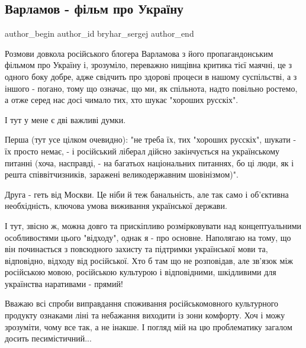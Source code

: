  
 
 
 
 
 
\subsection{Варламов - фільм про Україну}
\label{sec:06_11_2021.fb.bryhar_sergej.1.varlamov_film_pro_ukrainu}
 
\ifcmt
 author_begin
   author_id bryhar_sergej
 author_end
\fi

Розмови довкола російського блогера Варламова з його пропагандонським фільмом
про Україну і, зрозуміло, переважно нищівна критика тієї маячні, це з одного
боку добре, адже свідчить про здорові процеси в нашому суспільстві, а з іншого
- погано, тому що означає, що ми, як спільнота, надто повільно ростемо, а отже
серед нас досі чимало тих, хто шукає "хороших русскіх".

І тут у мене є дві важливі думки. 

Перша (тут усе цілком очевидно): "не треба їх, тих "хороших русскіх", шукати -
їх просто немає, - і російський ліберал дійсно  закінчується на українському
питанні (хоча, насправді, - на багатьох національних питаннях, бо ці люди, як і
решта співвітчизників, заражені великодержавним шовінізмом)".

Друга - геть від Москви. Це ніби й теж банальність, але так само і об'єктивна
необхідність, ключова умова виживання української держави.

І тут, звісно ж, можна довго та прискіпливо розмірковувати над концептуальними
особливостями цього "відходу", однак я - про основне. Наполягаю на тому, що він
починається з повсюдного захисту та підтримки української мови та, відповідно,
відходу від російської. Хто б там що не розповідав, але зв'язок між російською
мовою, російською культурою і відповідними, шкідливими для українства
наративами - прямий!

Вважаю всі спроби виправдання споживання російськомовного культурного продукту
ознаками ліні та небажання виходити із зони комфорту. Хоч і можу зрозуміти,
чому все так, а не інакше. І погляд мій на цю проблематику загалом досить
песимістичний...

